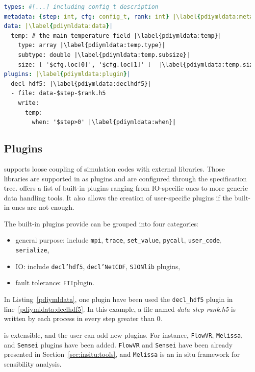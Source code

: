 \begin{lstlisting}[float=h!, label=pdiymldata, language=yaml, caption=Data description in \pdi YAML file]
types: #[...] including config_t description
metadata: {step: int, cfg: config_t, rank: int} |\label{pdiymldata:metadata}|
data: |\label{pdiymldata:data}|
  temp: # the main temperature field |\label{pdiymldata:temp}|
    type: array |\label{pdiymldata:temp.type}|
    subtype: double |\label{pdiymldata:temp.subsize}|
    size: [ '$cfg.loc[0]', '$cfg.loc[1]' ]  |\label{pdiymldata:temp.size}|
plugins: |\label{pdiymldata:plugin}|
  decl_hdf5: |\label{pdiymldata:declhdf5}|
  - file: data-$step-$rank.h5 
    write:
      temp:
        when: '$step>0' |\label{pdiymldata:when}|
\end{lstlisting}

\subsection{\pdi Plugins}\label{plugins}
\pdi supports loose coupling of simulation codes with external libraries. Those libraries are supported in \pdi as plugins and are configured through the specification tree. \pdi offers a list of built-in plugins ranging from IO-specific ones to more generic data handling tools. It also allows the creation of user-specific plugins if the built-in ones are not enough.     

The built-in plugins \pdi provide can be grouped into four categories: 
\begin{itemize}
    \item general purpose: include \texttt{mpi}, \texttt{trace}, \texttt{set\_value}, \texttt{pycall}, \texttt{user\_code}, \texttt{serialize},  
    \item IO: include \texttt{decl’hdf5}, \texttt{decl’NetCDF}, \texttt{SIONlib} plugins,
    \item fault tolerance: \texttt{FTI}plugin.
\end{itemize}

In Listing~\ref{pdiymldata}, one plugin have been used the \texttt{decl\_hdf5} plugin in line~\ref{pdiymldata:declhdf5}. In this example, a file named \textit{data-step-rank.h5} is written by each process in every step greater than 0. 

\pdi is extensible, and the user can add new plugins. For instance, \texttt{FlowVR}, \texttt{Melissa}, and \texttt{Sensei} plugins have been added. \texttt{FlowVR} and \texttt{Sensei} have been already presented in Section~\ref{sec:insitu:tools}, and \texttt{Melissa}\cite{terraz_melissa} is an in situ framework for sensibility analysis. 



